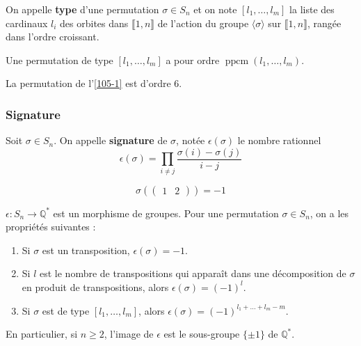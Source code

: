 	\begin{definition}
		On appelle \textbf{type} d'une permutation $\sigma \in S_n$ et on note $[l_1, \dots, l_m]$ la liste des cardinaux $l_i$ des orbites dans $\llbracket 1, n \rrbracket$ de l'action du groupe $\langle \sigma \rangle$ sur $\llbracket 1, n \rrbracket$, rangée dans l'ordre croissant.
	\end{definition}

	\begin{proposition}
		Une permutation de type $[l_1, \dots, l_m]$ a pour ordre $\operatorname{ppcm}(l_1, \dots, l_m)$.
	\end{proposition}

	\begin{example}
		La permutation de l'\cref{105-1} est d'ordre $6$.
	\end{example}

	\subsubsection{Signature}

	\begin{definition}
		Soit $\sigma \in S_n$. On appelle \textbf{signature} de $\sigma$, notée $\epsilon(\sigma)$ le nombre rationnel
		\[ \epsilon(\sigma) = \prod_{i \neq j} \frac{\sigma(i) - \sigma(j)}{i-j} \]
	\end{definition}

	\begin{example}
		\[ \sigma(\begin{pmatrix} 1 & 2 \end{pmatrix}) = -1 \]
	\end{example}

	\begin{proposition}
		$\epsilon : S_n \rightarrow \mathbb{Q}^*$ est un morphisme de groupes. Pour une permutation $\sigma \in S_n$, on a les propriétés suivantes :
		\begin{enumerate}[label=(\roman*)]
			\item Si $\sigma$ est un transposition, $\epsilon(\sigma) = -1$.
			\item Si $l$ est le nombre de transpositions qui apparaît dans une décomposition de $\sigma$ en produit de transpositions, alors $\epsilon(\sigma) = (-1)^l$.
			\item Si $\sigma$ est de type $[l_1, \dots, l_m]$, alors $\epsilon(\sigma) = (-1)^{l_1 + \dots + l_m - m}$.
		\end{enumerate}
		En particulier, si $n \geq 2$, l'image de $\epsilon$ est le sous-groupe $\{ \pm 1 \}$ de $\mathbb{Q}^*$.
	\end{proposition}

